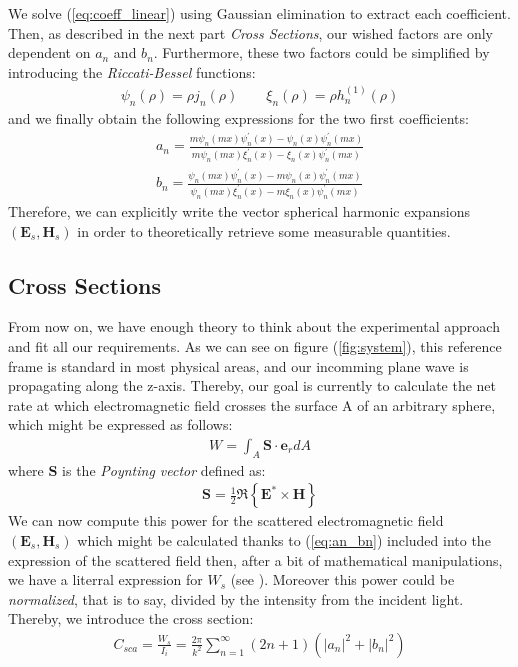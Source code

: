 \documentclass{article}
\numberwithin{equation}{section}
\begin{document}
We solve (\ref{eq:coeff_linear}) using Gaussian elimination to extract each coefficient. Then, as described in the next part \textit{Cross Sections}, our wished factors are only dependent on $a_{n}$ and $b_{n}$. Furthermore, these two factors could be simplified by introducing the \textit{Riccati-Bessel} functions:
\begin{align}
\psi_{n}(\rho)=\rho j_{n}(\rho) \qquad \xi_{n}(\rho)=\rho h^{(1)}_{n}(\rho)
\end{align}
and we finally obtain the following expressions for the two first coefficients:
\begin{equation}\label{eq:an_bn}
\begin{aligned}
a_{n} = \frac{m\psi_{n}(mx)\psi^{'}_{n}(x)-\psi_{n}(x)\psi^{'}_{n}(mx)}{m\psi_{n}(mx)\xi^{'}_{n}(x)-\xi_{n}(x)\psi^{'}_{n}(mx)}\\
b_{n} = \frac{\psi_{n}(mx)\psi^{'}_{n}(x)-m\psi_{n}(x)\psi^{'}_{n}(mx)}{\psi_{n}(mx)\xi^{'}_{n}(x)-m\xi_{n}(x)\psi^{'}_{n}(mx)}
\end{aligned}
\end{equation}
Therefore, we can explicitly write the vector spherical harmonic expansions $(\textbf{E}_{s}, \textbf{H}_{s})$ in order to theoretically retrieve some measurable quantities.

\subsection{Cross Sections}

From now on, we have enough theory to think about the experimental approach and fit all our requirements. As we can see on figure (\ref{fig:system}), this reference frame is standard in most physical areas, and our incomming plane wave is propagating along the z-axis. Thereby, our goal is currently to calculate the net rate at which electromagnetic field crosses the surface A of an arbitrary sphere, which might be expressed as follows:
\begin{align}\label{eq:power_def}
W=\int_{A}^{}\textbf{S}\cdot \textbf{e}_{r}dA
\end{align}
where $\textbf{S}$ is the \textit{Poynting vector} defined as:
\begin{align}
\textbf{S} = \frac{1}{2}\Re\left\{\textbf{E}^{*} \times \textbf{H}\right\}
\end{align}
We can now compute this power for the scattered electromagnetic field $(\textbf{E}_{s}, \textbf{H}_{s})$ which might be calculated thanks to (\ref{eq:an_bn}) included into the expression of the scattered field then, after a bit of mathematical manipulations, we have a literral expression for $W_{s}$ (see \cite{craigdonald}). Moreover this power could be \textit{normalized}, that is to say, divided by the intensity from the incident light. Thereby, we introduce the cross section:
\begin{align}\label{eq:csca}
C_{sca}=\frac{W_{s}}{I_{i}}=\frac{2\pi}{k^{2}}\sum_{n=1}^{\infty }(2n+1)(\left| a_{n} \right|^{2}+\left| b_{n} \right|^{2})
\end{align}
\end{document}
